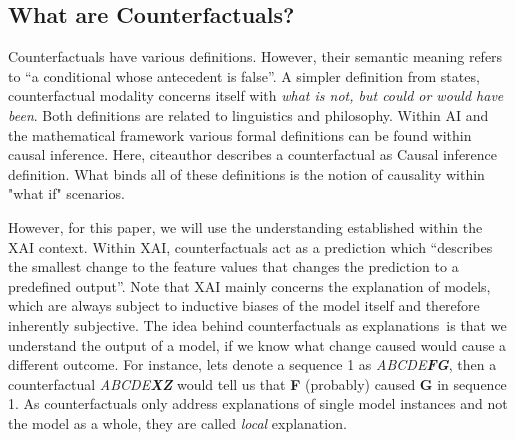 \documentclass[./../../paper.tex]{subfiles}
\begin{document}
\subsection{What are Counterfactuals?}
Counterfactuals have various definitions. However, their semantic meaning refers to \enquote{a conditional whose antecedent is false}\autocite{_Counterfactual_}. A simpler definition from \citeauthor{starr_Counterfactuals_2021} states, counterfactual modality concerns itself with \emph{what is not, but could or would have been}.
Both definitions are related to linguistics and philosophy. Within AI and the mathematical framework various formal definitions can be found within causal inference\autocite{hitchcock_CausalModels_2020}. Here, citeauthor describes a counterfactual as {Causal inference definition}. What binds all of these definitions is the notion of causality within "what if" scenarios.

However, for this paper, we will use the understanding established within the \gls{XAI} context. Within \gls{XAI}, counterfactuals act as a prediction which \enquote{describes the smallest change to the feature values that changes the prediction to a predefined output}\autocite{molnar2019}. Note that \gls{XAI} mainly concerns the explanation of models, which are always subject to inductive biases of the model itself and therefore inherently subjective. The idea behind counterfactuals as explanations\footnotemark ~is that we understand the output of a model, if we know what change caused would cause a different outcome. For instance, lets denote a sequence 1 as \textit{ABCDE\textbf{FG}}, then a counterfactual \textit{ABCDE\textbf{XZ}} would tell us that \textbf{F} (probably) caused \textbf{G} in sequence 1. As counterfactuals only address explanations of single model instances and not the model as a whole, they are called \emph{local} explanation.
\end{document}
